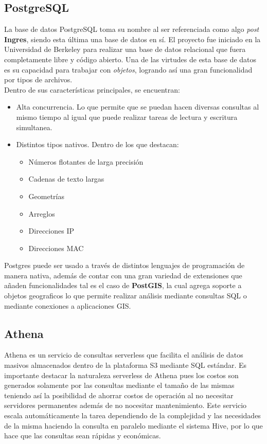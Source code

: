 \subsection{PostgreSQL}
La base de datos PostgreSQL toma su nombre al ser referenciada como algo \textit{post} \textbf{Ingres}, siendo esta última una base de datos en sí. El proyecto fue iniciado en la Universidad de Berkeley para realizar una base de datos relacional que fuera completamente libre y código abierto. Una de las virtudes de esta base de datos es su capacidad para trabajar con \textit{objetos}, logrando así una gran funcionalidad por tipos de archivos.\\
Dentro de sus características principales, se encuentran:\\
\begin{itemize}
    \item Alta concurrencia. Lo que permite que se puedan hacen diversas consultas al mismo tiempo al igual que puede realizar tareas de lectura y escritura simultanea.
    \item Distintos tipos nativos. Dentro de  los que destacan:
        \begin{itemize}
            \item Números flotantes de larga precisión
            \item Cadenas de texto largas
            \item Geometrías
            \item Arreglos
            \item Direcciones IP
            \item Direcciones MAC
        \end{itemize}
\end{itemize}
Postgres puede ser usado a través de distintos lenguajes de programación de manera nativa, además de contar con una gran variedad de extensiones que añaden funcionalidades tal es el caso de \textbf{PostGIS}, la cual agrega soporte a objetos geograficos lo que permite realizar análisis mediante consultas SQL o mediante conexiones a aplicaciones GIS.\cite{Postgres}

\subsection{Athena}
Athena es un servicio de consultas serverless que facilita el análisis de datos masivos almacenados dentro de la plataforma S3 mediante SQL estándar. Es importante destacar la naturaleza serverless de Athena pues los costos son generados solamente por las consultas mediante el tamaño de las mismas teniendo así la posibilidad de ahorrar costos de operación al no necesitar servidores permanentes además de no nocesitar mantenimiento. Este servicio escala automáticamente la tarea dependiendo de la complejidad y las necesidades de la misma haciendo la consulta en paralelo mediante el sistema Hive, por lo que hace que las consultas sean rápidas y económicas.\cite{Athena}
